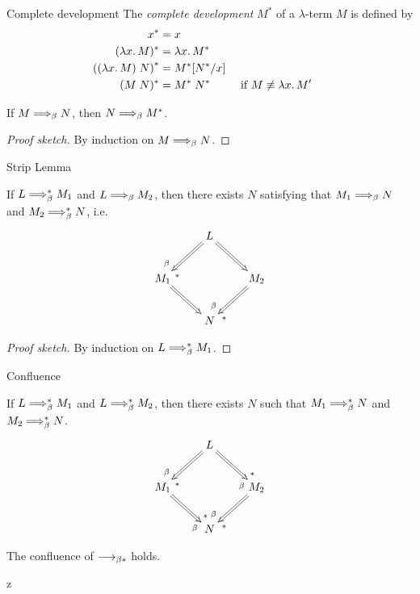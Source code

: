 \begin{frame}{Complete development}
  The \emph{complete development} $M^*$ of a $\lambda$-term $M$ is defined by
  \begin{align*}
    x^*      & = x \\
    (\lambda x.\, M)^* & = \lambda x.\, M^* \\
    \left((\lambda x.\, M)\;N\right)^* & = M^*[{N^*}/{x}] \\
    (M\;N)^* & = M^*\;N^* && \text{ if $M \not\equiv \lambda x.\,M'$ } 
  \end{align*}
  \begin{theorem}
    If $M \Longrightarrow_{\beta} N$, then $N \Longrightarrow_{\beta} M^*$.
  \end{theorem}
  \begin{proof}[Proof sketch]
    By induction on $M \Longrightarrow_{\beta} N$.
    
  \end{proof}
\end{frame}

\begin{frame}{Strip Lemma}
  \begin{theorem}
    If $L \Longrightarrow_{\beta}^* M_1$ and $L \Longrightarrow_{\beta} M_2$, then there exists $N$
    satisfying that $M_1 \Longrightarrow_{\beta} N$ and $M_2 \Longrightarrow_{\beta}^* N$, i.e.\
    \[
      \xymatrix{
        & L \ar@{=>}[rd] \ar@{=>}[ld]^(.8){*}_(.8){\beta} \\
        M_1 \ar@{=>}[rd] & & M_2 \ar@{=>}[ld]^(.8){*}_(.8){\beta} \\
            & N
      }
    \]
  \end{theorem}
  \begin{proof}[Proof sketch]
    By induction on $L \Longrightarrow_{\beta}^* M_1$. 
  \end{proof}
\end{frame}

\begin{frame}{Confluence}
  \begin{theorem}
    If $L \Longrightarrow_{\beta}^* M_1$ and $L \Longrightarrow_{\beta}^* M_2$, then there exists $N$ such that $M_1 \Longrightarrow_{\beta}^* N$ and $M_2 \Longrightarrow_{\beta}^* N$.
    \[
      \xymatrix{
        & L \ar@{=>}[rd]^(.8){*}_(.8){\beta} \ar@{=>}[ld]^(.8){*}_(.8){\beta} \\
        M_1 \ar@{=>}[rd]^(.8){*}_(.8){\beta} & & M_2 \ar@{=>}[ld]^(.8){*}_(.8){\beta} \\
            & N
      }
    \]
  \end{theorem}
  \begin{corollary}
    The confluence of $\longrightarrow_{\beta*}$ holds. 
    
  \end{corollary}
  
\end{frame}
z

